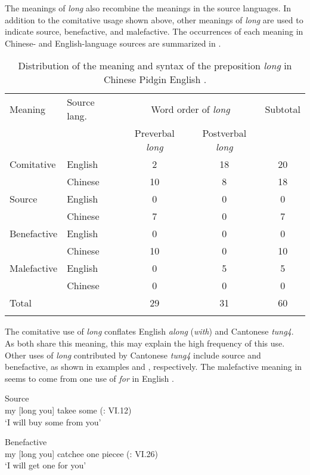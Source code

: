 \documentclass[output=paper]{langsci/langscibook}
\begin{document}
The meanings of \textit{long} also recombine the meanings in the source languages. In addition to the comitative usage shown above, other meanings of \textit{long} are used to indicate source, benefactive, and malefactive. The occurrences of each meaning in Chinese- and English-language sources are summarized in .

\begin{table} 
\begin{tabular}{llccc}
\lsptoprule
Meaning & Source lang. & \multicolumn{2}{c}{Word order of \textit{long}} & Subtotal\\\cmidrule(lr){3-4}
&  & Preverbal \textit{long} & Postverbal \textit{long} & \\\midrule
Comitative & English & 2 & 18 & 20\\
& Chinese & 10 & 8 & 18\\
Source & English & 0 & 0 & 0\\
& Chinese & 7 & 0 & 7\\
Benefactive & English & 0 & 0 & 0\\
& Chinese & 10 & 0 & 10\\
Malefactive & English & 0 & 5 & 5\\
& Chinese & 0 & 0 & 0\\
\midrule
Total &  & 29 & 31 & 60\\
\lspbottomrule
\end{tabular}
\caption{\label{tab:7:1}Distribution of the meaning and syntax of the preposition \textit{long} in Chinese Pidgin English \citep{li_origins_2011}.}
\end{table}

The comitative use of \textit{long} conflates English \textit{along} (\textit{with}) and Cantonese \textit{tung4}. As both share this meaning, this may explain the high frequency of this use. Other uses of \textit{long} contributed by Cantonese \textit{tung4} include source and benefactive, as shown in examples  and , respectively. The malefactive meaning in  seems to come from one use of \textit{for} in English \citep{li_origins_2011}. 

\ea%
    \label{ex:7:7}
Source\\
my [long you] takee some (\citealt{tong_chinese_1862}: VI.12)\\
\glt ‘I will buy some from you’

\ex%
    \label{ex:7:8}
Benefactive\\
my [long you] catchee one piecee (\citealt{tong_chinese_1862}: VI.26)\\
\glt ‘I will get one for you’ 
\end{document}
